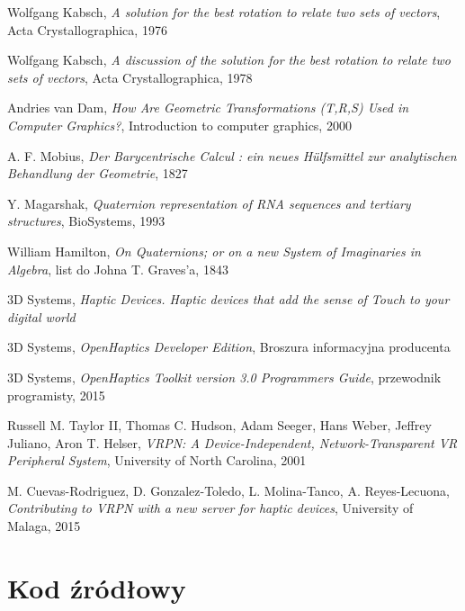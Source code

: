 \documentclass[licencjacka]{pracamgr}
\begin{document}
\begin{thebibliography}{99}
 Wolfgang Kabsch, \textit{A solution for the best rotation to relate two sets of vectors}, Acta Crystallographica, 1976

 Wolfgang Kabsch, \textit{A discussion of the solution for the best rotation to relate two sets of vectors}, Acta Crystallographica, 1978

 Andries van Dam, \textit{How Are Geometric
Transformations (T,R,S) Used in Computer Graphics?}, Introduction to computer graphics, 2000

 A. F. Mobius, \textit{Der Barycentrische Calcul : ein neues Hülfsmittel zur analytischen Behandlung der Geometrie}, 1827

 Y. Magarshak, \textit{Quaternion representation of RNA sequences and tertiary structures}, BioSystems, 1993

 William Hamilton, \textit{On Quaternions; or on a new System of Imaginaries in Algebra}, list do Johna T. Graves'a, 1843

 3D Systems, \textit{Haptic Devices. Haptic devices that add the sense of Touch to your digital world}

 3D Systems, \textit{OpenHaptics Developer Edition}, Broszura informacyjna producenta

 3D Systems, \textit{OpenHaptics Toolkit version 3.0 Programmers Guide}, przewodnik programisty, 2015

 Russell M. Taylor II, Thomas C. Hudson, Adam Seeger, Hans Weber, Jeffrey Juliano, Aron T. Helser, \textit{VRPN: A Device-Independent, Network-Transparent VR Peripheral System}, University of North Carolina, 2001

 M. Cuevas-Rodriguez, D. Gonzalez-Toledo, L. Molina-Tanco, A. Reyes-Lecuona, \textit{Contributing to VRPN with a new server for haptic devices}, University of Malaga, 2015

\end{thebibliography}

\chapter*{Kod źródłowy}

\end{document}
